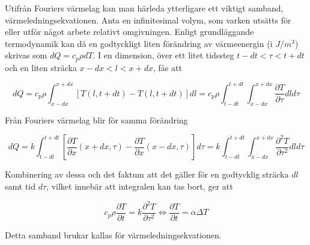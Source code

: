 Utifrån Fouriers värmelag kan man härleda ytterligare ett viktigt samband, värmeledningsekvationen. Anta en infinitesimal volym, som varken utsätts för eller utför något arbete relativt omgivningen. Enligt grundläggande termodynamik kan då en godtyckligt liten förändring av värmeenergin (i $\unit{}{J/m^3}$) skrivas som $dQ = c_p \rho dT$.  I en dimension, över ett litet tidssteg $t-dt< \tau < t+dt$ och en liten sträcka $x-dx < l < x+dx$, fås att

\begin{equation}
dQ = c_p \rho \int_{x-dx}^{x+dx} \left[ T\left( l, t+dt\right) - T\left( l, t+dt\right)\right]dl = c_p \rho \int_{t-dt}^{t+dt} \int_{x-dx}^{x+dx} \frac{\partial T}{\partial \tau} dld\tau
\end{equation}

Från Fouriers värmelag blir för samma förändring

\begin{equation}
dQ = k\int_{t-dt}^{t+dt} \left[ \frac{\partial T}{\partial x}\left( x + dx, \tau \right) - \frac{\partial T}{\partial x}\left( x-dx, \tau \right)\right]d\tau = k\int_{t-dt}^{t+dt} \int_{x-dx}^{x+dx} \frac{\partial^2 T}{\partial \tau^2} dld\tau
\end{equation}

Kombinering av dessa och det faktum att det gäller för en godtycklig sträcka $dl$ samt tid $d\tau$, vilket innebär att integralen kan tas bort, ger att

\begin{equation}\boxed{ \; \; \;
c_p \rho \frac{\partial T}{\partial t} = k \frac{\partial^2 T}{\partial \tau^2} \Leftrightarrow \frac{\partial T}{\partial t} = \alpha \Delta T
\; \; \; }
\end{equation}

Detta samband brukar kallas för värmeledningsekvationen.
